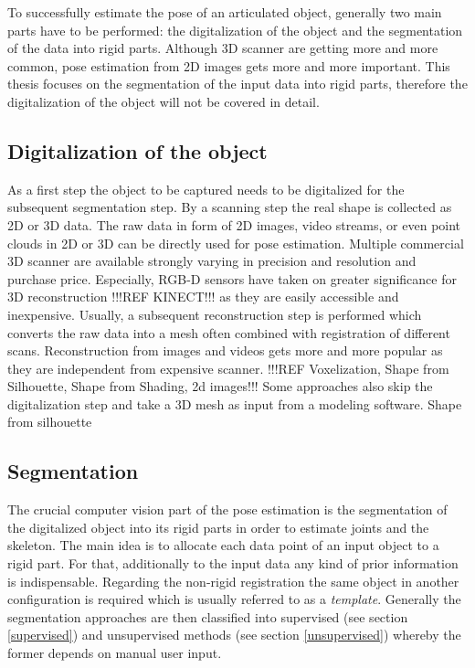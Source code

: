 
To successfully estimate the pose of an articulated object, generally two main parts have to be performed: the digitalization of the object and the segmentation of the data into rigid parts. Although 3D scanner are getting more and more common, pose estimation from 2D images gets more and more important. This thesis focuses on the segmentation of the input data into rigid parts, therefore the digitalization of the object will not be covered in detail.

\subsection{Digitalization of the object}
\label{sec:reconstruction}
As a first step the object to be captured needs to be digitalized for the subsequent segmentation step. By a scanning step the real shape is collected as 2D or 3D data. The raw data in form of 2D images, video streams, or even point clouds in 2D or 3D can be directly used for pose estimation. Multiple commercial 3D scanner are available strongly varying in precision and resolution and purchase price. Especially, RGB-D sensors have taken on greater significance for 3D reconstruction !!!REF KINECT!!! as they are easily accessible and inexpensive. Usually, a subsequent reconstruction step is performed which converts the raw data into a mesh often combined with registration of different scans. Reconstruction from images and videos gets more and more popular as they are independent from expensive scanner. !!!REF
Voxelization, Shape from Silhouette, Shape from Shading, 2d images!!! Some approaches also skip the digitalization step and take a 3D mesh as input from a modeling software. Shape from silhouette \cite{mocap}
%
%
\subsection{Segmentation}
\label{sec:segmentation}

The crucial computer vision part of the pose estimation is the segmentation of the digitalized object into its rigid parts in order to estimate joints and the skeleton. The main idea is to allocate each data point of an input object to a rigid part. For that, additionally to the input data any kind of prior information is indispensable. Regarding the non-rigid registration the same object in another configuration is required which is usually referred to as a \textit{template}. Generally the segmentation approaches are then classified into supervised (see section \ref{supervised}) and unsupervised methods (see section \ref{unsupervised}) whereby the former depends on manual user input. 

